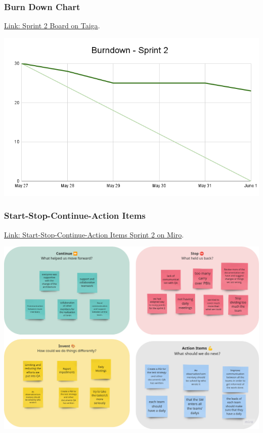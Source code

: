 \hypertarget{burndownchart-s2}{
\subsubsection{Burn Down Chart}\label{Burn Down Chart S2}}
\href{https://tree.taiga.io/project/joseluis-teran-coffeetime/taskboard/sprint-2-12274}{Link: Sprint 2 Board on Taiga}.

\includegraphics[width=\textwidth]{./artifacts/src/sprint-2/assets/Burndown-Sprint2.png}

\hypertarget{startstopcontinueactionitems-s2}{
\subsubsection{Start-Stop-Continue-Action Items}\label{Start-Stop-Continue-Action Items S2}}
\href{https://miro.com/app/board/uXjVKDO7l8M=/?moveToWidget=3458764590247693277&cot=14}{Link: Start-Stop-Continue-Action Items Sprint 2 on Miro}.

\includegraphics[width=\textwidth]{./artifacts/src/sprint-2/assets/retrospective-s2.png}
